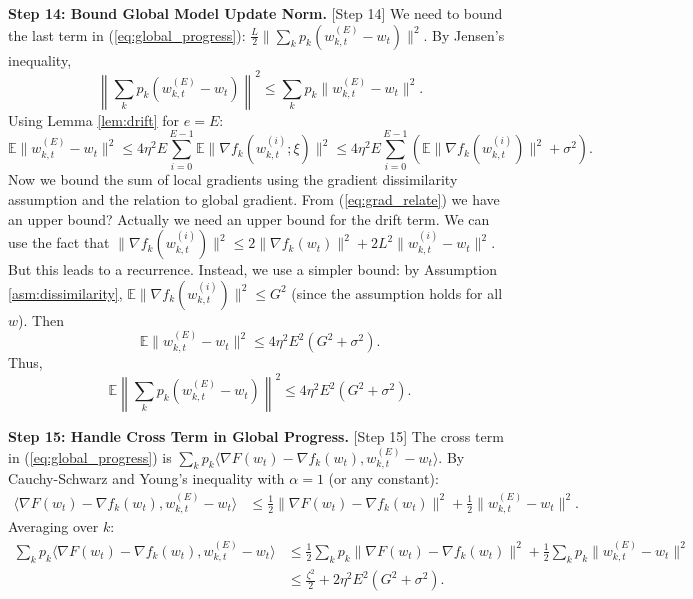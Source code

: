 \documentclass{article}
\begin{document}
\textbf{Step 14: Bound Global Model Update Norm.} [Step 14] %
We need to bound the last term in (\ref{eq:global_progress}): $\frac{L}{2} \| \sum_k p_k (w_{k,t}^{(E)} - w_t) \|^2$.
By Jensen's inequality,
\begin{equation}
    \left\| \sum_k p_k (w_{k,t}^{(E)} - w_t) \right\|^2 \leq \sum_k p_k \| w_{k,t}^{(E)} - w_t \|^2.
\end{equation}
Using Lemma \ref{lem:drift} for $e=E$:
\begin{equation}
    \mathbb{E} \| w_{k,t}^{(E)} - w_t \|^2 \leq 4 \eta^2 E \sum_{i=0}^{E-1} \mathbb{E} \| \nabla f_k(w_{k,t}^{(i)}; \xi) \|^2 \leq 4 \eta^2 E \sum_{i=0}^{E-1} \left( \mathbb{E} \| \nabla f_k(w_{k,t}^{(i)}) \|^2 + \sigma^2 \right).
\end{equation}
Now we bound the sum of local gradients using the gradient dissimilarity assumption and the relation to global gradient. From (\ref{eq:grad_relate}) we have an upper bound? Actually we need an upper bound for the drift term. We can use the fact that $\| \nabla f_k(w_{k,t}^{(i)}) \|^2 \leq 2 \| \nabla f_k(w_t) \|^2 + 2 L^2 \| w_{k,t}^{(i)} - w_t \|^2$. But this leads to a recurrence. Instead, we use a simpler bound: by Assumption \ref{asm:dissimilarity}, $\mathbb{E} \| \nabla f_k(w_{k,t}^{(i)}) \|^2 \leq G^2$ (since the assumption holds for all $w$). Then
\begin{equation}
    \mathbb{E} \| w_{k,t}^{(E)} - w_t \|^2 \leq 4 \eta^2 E^2 (G^2 + \sigma^2).
\end{equation}
Thus,
\begin{equation}
    \mathbb{E} \left\| \sum_k p_k (w_{k,t}^{(E)} - w_t) \right\|^2 \leq 4 \eta^2 E^2 (G^2 + \sigma^2). \label{eq:update_norm}
\end{equation}

\textbf{Step 15: Handle Cross Term in Global Progress.} [Step 15] %
The cross term in (\ref{eq:global_progress}) is $\sum_k p_k \langle \nabla F(w_t) - \nabla f_k(w_t), w_{k,t}^{(E)} - w_t \rangle$.
By Cauchy-Schwarz and Young's inequality with $\alpha = 1$ (or any constant):
\begin{align}
    \langle \nabla F(w_t) - \nabla f_k(w_t), w_{k,t}^{(E)} - w_t \rangle &\leq \frac{1}{2} \| \nabla F(w_t) - \nabla f_k(w_t) \|^2 + \frac{1}{2} \| w_{k,t}^{(E)} - w_t \|^2.
\end{align}
Averaging over $k$:
\begin{align}
    \sum_k p_k \langle \nabla F(w_t) - \nabla f_k(w_t), w_{k,t}^{(E)} - w_t \rangle &\leq \frac{1}{2} \sum_k p_k \| \nabla F(w_t) - \nabla f_k(w_t) \|^2 + \frac{1}{2} \sum_k p_k \| w_{k,t}^{(E)} - w_t \|^2 \\
    &\leq \frac{\zeta^2}{2} + 2 \eta^2 E^2 (G^2 + \sigma^2). \label{eq:cross_term}
\end{align}
\end{document}
